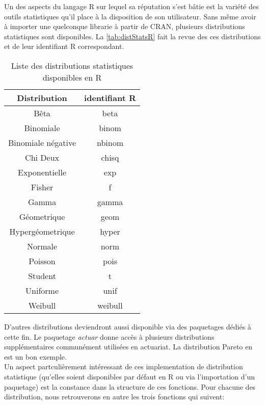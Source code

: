 Un des aspects du langage R sur lequel sa réputation s'est bâtie est la variété des outils statistiques qu'il place à la disposition de son utilisateur. Sans même avoir à importer une quelconque librarie à partir de CRAN, plusieurs distributions statistiques sont disponibles. La \autoref{tab:distStatsR} fait la revue des ces distributions et de leur identifiant R correspondant. \cite{distStatsR} \\

\begin{table}[h]
	\centering
	\begin{tabular}{c c}
		\textbf{Distribution} & \textbf{identifiant R} \\
		\hline
		Bêta & beta \\
		Binomiale & binom \\
		Binomiale négative & nbinom \\
		Chi Deux & chisq \\
		Exponentielle & exp \\
		Fisher & f \\
		Gamma & gamma \\
		Géometrique & geom \\
		Hypergéometrique & hyper \\
		Normale & norm \\
		Poisson & pois \\
		Student & t \\
		Uniforme & unif \\
		Weibull & weibull	
	\end{tabular}
	\caption{Liste des distributions statistiques disponibles en R}
\end{table}
\label{tab:distStatsR}

\noindent
D'autres distributions deviendront aussi disponible via des paquetages dédiés à cette fin. Le paquetage \emph{actuar} donne accès à plusieurs distributions supplémentaires communément utilisées en actuariat. La distribution Pareto en est un bon exemple. \\

\noindent
Un aspect partculièrement intéressant de ces implementation de distribution statistique (qu'elles soient disponibles par défaut en R ou via l'importation d'un paquetage) est la constance dans la structure de ces fonctions. Pour chacune des distribution, nous retrouverons en autre les trois fonctions qui suivent: \\

